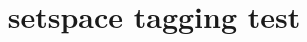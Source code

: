 \documentclass{article}
\title{setspace tagging test}
\begin{document}
\kant[1]
\begin{singlespace}
\kant[2]
\end{singlespace}
\begin{onehalfspace}
\kant[3]
\end{onehalfspace}
\kant[4]
\end{document}
